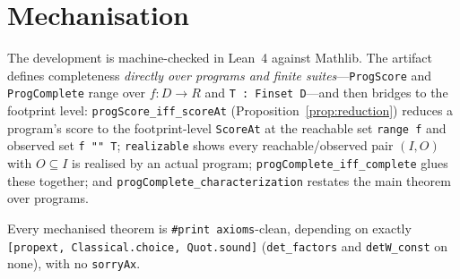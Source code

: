 \documentclass[runningheads,envcountsect,envcountsame]{llncs}
\begin{document}
\section{Mechanisation}
\label{sec:mech}

The development is machine-checked in Lean~4 against Mathlib. The artifact
defines completeness \emph{directly over programs and finite
suites}---\texttt{ProgScore} and \texttt{ProgComplete} range over
$f : D \to R$ and \texttt{T : Finset D}---and then bridges to the footprint
level: \texttt{progScore\_iff\_scoreAt} (Proposition~\ref{prop:reduction})
reduces a program's score to the footprint-level \texttt{ScoreAt} at the
reachable set \texttt{range f} and observed set \texttt{f "" T};
\texttt{realizable} shows every reachable/observed pair $(I,O)$ with
$O \subseteq I$ is realised by an actual program;
\texttt{progComplete\_iff\_complete} glues these together; and
\texttt{progComplete\_characterization} restates the main theorem over programs.

Every mechanised theorem is \texttt{\#print axioms}-clean, depending on exactly
\texttt{[propext, Classical.choice, Quot.sound]} (\texttt{det\_factors} and
\texttt{detW\_const} on none), with no \texttt{sorryAx}.
\end{document}
